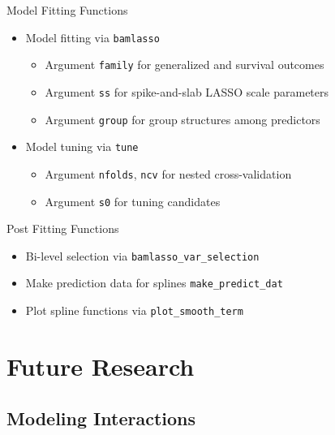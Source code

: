 \documentclass[
  ignorenonframetext,
  aspectratio=169]{beamer}
\providecommand{\tightlist}{%
  \setlength{\itemsep}{0pt}\setlength{\parskip}{0pt}}
\begin{document}
\begin{frame}[fragile]{Model Fitting Functions}
\protect\hypertarget{model-fitting-functions}{}
\begin{itemize}
\tightlist
\item
  Model fitting via \texttt{bamlasso}

  \begin{itemize}
  \tightlist
  \item
    Argument \texttt{family} for generalized and survival outcomes
  \item
    Argument \texttt{ss} for spike-and-slab LASSO scale parameters
  \item
    Argument \texttt{group} for group structures among predictors
  \end{itemize}
\item
  Model tuning via \texttt{tune}

  \begin{itemize}
  \tightlist
  \item
    Argument \texttt{nfolds}, \texttt{ncv} for nested cross-validation
  \item
    Argument \texttt{s0} for tuning candidates
  \end{itemize}
\end{itemize}
\end{frame}

\begin{frame}[fragile]{Post Fitting Functions}
\protect\hypertarget{post-fitting-functions}{}
\begin{itemize}
\tightlist
\item
  Bi-level selection via \texttt{bamlasso\_var\_selection}
\item
  Make prediction data for splines \texttt{make\_predict\_dat}
\item
  Plot spline functions via \texttt{plot\_smooth\_term}
\end{itemize}
\end{frame}

\hypertarget{future-research}{%
\section{Future Research}\label{future-research}}

\hypertarget{modeling-interactions}{%
\subsection{Modeling Interactions}\label{modeling-interactions}}
\end{document}
